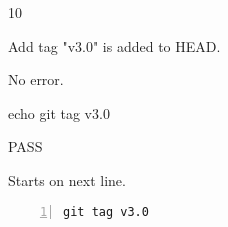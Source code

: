 \begin{description}[align=right,leftmargin=3.2cm,labelindent=3.0cm]
\item[Step:] 10
\item[Confirm:] Add tag "v3.0" is added to HEAD.
\item[Expectation:] No error.
\item[Command:] echo git  tag v3.0
\item[Test Result:] PASS
\item[Evidence:] Starts on next line.
\end{description}
\begin{lstlisting}[numbers=left]
git tag v3.0

\end{lstlisting}
